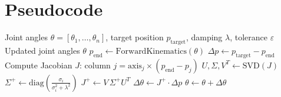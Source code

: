 \documentclass[11pt]{article}
\begin{document}
\section{Pseudocode}

\begin{algorithm}[H]
\caption{Inverse Kinematics via Damped Least Squares}
\begin{algorithmic}[1]
\Require Joint angles $\theta = [\theta_1, \dots, \theta_n]$, target position $p_{\text{target}}$, damping $\lambda$, tolerance $\varepsilon$
\Ensure Updated joint angles $\theta$
    \State $p_{\text{end}} \gets \text{ForwardKinematics}(\theta)$ 
    \State $\Delta p \gets p_{\text{target}} - p_{\text{end}}$
    \State Compute Jacobian $J$: column $j = \text{axis}_j \times (p_{\text{end}} - p_j)$
    \State $U, \Sigma, V^T \gets \text{SVD}(J)$ 
    \State $\Sigma^+ \gets \text{diag}\!\left(\frac{\sigma_i}{\sigma_i^2 + \lambda^2}\right)$ 
    \State $J^+ \gets V \, \Sigma^+ U^T$
    \State $\Delta\theta \gets J^+ \cdot \Delta p$
    \State $\theta \gets \theta + \Delta\theta$
\EndWhile
\end{algorithmic}
\end{algorithm}
\end{document}

